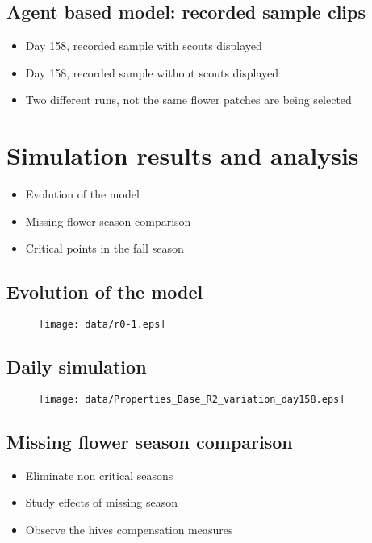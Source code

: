 \documentclass[
	paper=128mm:96mm,
	fontsize=11pt,
	pagesize,
	parskip=half-,
]{scrartcl}
\theoremstyle{mythmstyle} %
\begin{document}

\subsection*{Agent based model: recorded sample clips}
	\begin{itemize}
		\item Day 158, recorded sample with scouts displayed
		\item Day 158, recorded sample without scouts displayed
		\item Two different runs, not the same flower patches are being selected
	\end{itemize}
	\clearpage
\section{Simulation results and analysis}
	\begin{itemize}
		\item Evolution of the model
		\item Missing flower season comparison
		\item Critical points in the fall season
	\end{itemize}
	\clearpage
\subsection*{Evolution of the model}
	\begin{figure}[H]
		\centering
		\texttt{[image: data/r0-1.eps]}
	\end{figure}
	\clearpage
\subsection*{Daily simulation}
	\begin{figure}[H]
		\centering
		\texttt{[image: data/Properties\_Base\_R2\_variation\_day158.eps]}
	\end{figure}
	\clearpage
\subsection*{Missing flower season comparison}
	\begin{itemize}
		\item Eliminate non critical seasons
		\item Study effects of missing season
		\item Observe the hives compensation measures
	\end{itemize}
	\clearpage
\end{document}
